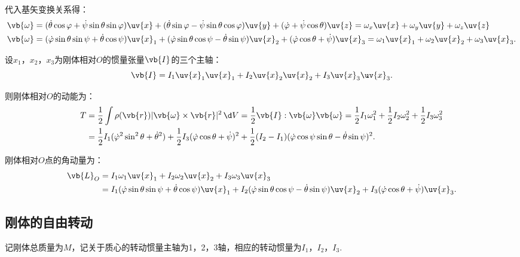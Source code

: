 代入基矢变换关系得：
\begin{align*}
	\vb{\omega} & = (\dot{\theta} \cos \varphi + \dot{\psi} \sin \theta \sin \varphi) \uv{x} + (\dot{\theta} \sin \varphi - \dot{\psi} \sin \theta \cos \varphi) \uv{y} + (\dot{\varphi} + \dot{\psi} \cos \theta) \uv{z}=\omega_x \uv{x}+\omega_y \uv{y}+\omega_z \uv{z}        \\
	\vb{\omega} & = (\dot{\varphi} \sin \theta \sin \psi + \dot{\theta} \cos \psi) \uv{x}_1 + (\dot{\varphi} \sin \theta \cos \psi - \dot{\theta} \sin \psi) \uv{x}_2 + (\dot{\varphi} \cos \theta + \dot{\psi}) \uv{x}_3=\omega_1 \uv{x}_1+\omega_2 \uv{x}_2+\omega_3 \uv{x}_3.
\end{align*}

设\(x_1\)，\(x_2\)，\(x_3\)为刚体相对\(O\)的惯量张量\(\vb{I}\)的三个主轴：
\begin{equation*}
	\vb{I} = I_1 \uv{x}_1 \uv{x}_1 + I_2 \uv{x}_2 \uv{x}_2 + I_3 \uv{x}_3 \uv{x}_3.
\end{equation*}

则刚体相对\(O\)的动能为：
\begin{align*}
	T & = \frac{1}{2} \int \rho(\vb{r}) |\vb{\omega} \times \vb{r}|^2 \, \d V = \frac{1}{2} \vb{I} : \vb{\omega} \vb{\omega} = \frac{1}{2} I_1 \omega_1^2 + \frac{1}{2} I_2 \omega_2^2 + \frac{1}{2} I_3 \omega_3^2\notag           \\
	  & = \frac{1}{2} I_1 (\dot{\varphi}^2 \sin^2 \theta + \dot{\theta}^2) + \frac{1}{2} I_3 (\dot{\varphi} \cos \theta + \dot{\psi})^2 + \frac{1}{2} (I_2 - I_1) (\dot{\varphi} \cos \psi \sin \theta - \dot{\theta} \sin \psi)^2.
\end{align*}

刚体相对\(O\)点的角动量为：
\begin{align*}
	\vb{L}_{O} & = I_1 \omega_1 \uv{x}_1 + I_2 \omega_2 \uv{x}_2 + I_3 \omega_3 \uv{x}_3\notag                                                                                                                                        \\
	           & = I_1 (\dot{\varphi} \sin \theta \sin \psi + \dot{\theta} \cos \psi) \uv{x}_1 + I_2 (\dot{\varphi} \sin \theta \cos \psi - \dot{\theta} \sin \psi) \uv{x}_2 + I_3 (\dot{\varphi} \cos \theta + \dot{\psi}) \uv{x}_3.
\end{align*}
\subsection{刚体的自由转动}
记刚体总质量为\(M\)，记关于质心的转动惯量主轴为1，2，3轴，相应的转动惯量为\(I_1\)，\(I_2\)，\(I_3\).

